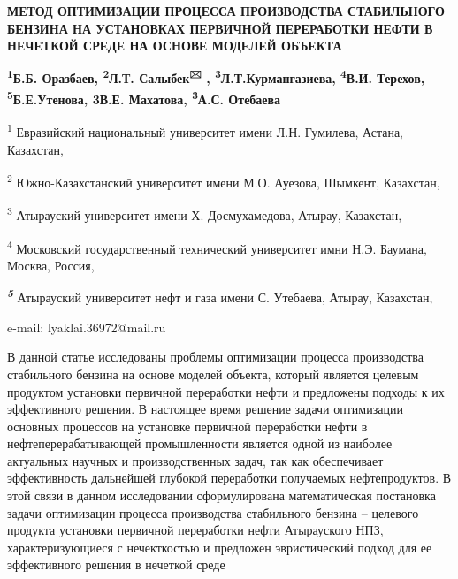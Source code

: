 \begin{center}

{\bfseries МЕТОД ОПТИМИЗАЦИИ ПРОЦЕССА ПРОИЗВОДСТВА СТАБИЛЬНОГО БЕНЗИНА НА УСТАНОВКАХ ПЕРВИЧНОЙ ПЕРЕРАБОТКИ НЕФТИ В НЕЧЕТКОЙ СРЕДЕ НА ОСНОВЕ МОДЕЛЕЙ ОБЪЕКТА}

{\bfseries \textsuperscript{1}Б.Б. Оразбаев, \textsuperscript{2}Л.Т.
Салыбек\textsuperscript{🖂} , \textsuperscript{3}Л.Т.Курмангазиева,
\textsuperscript{4}В.И. Терехов, \textsuperscript{5}Б.Е.Утенова, {3}В.Е. Махатова, \textsuperscript{3}А.С.
Отебаева}

\textsuperscript{1} Евразийский национальный университет имени Л.Н.
Гумилева, Астана, Казахстан,

\textsuperscript{2} Южно-Казахстанский университет имени М.О. Ауезова,
Шымкент, Казахстан,

\textsuperscript{3} Атырауский университет имени Х. Досмухамедова,
Атырау, Казахстан,

\textsuperscript{4} Московский государственный технический университет
имни Н.Э. Баумана, Москва, Россия,

\emph{{\bfseries \textsuperscript{5}}} Атырауский университет нефт и газа
имени С. Утебаева, Атырау, Казахстан,

e-mail: lyaklai.36972@mail.ru
\end{center}

В данной статье исследованы проблемы оптимизации процесса производства
стабильного бензина на основе моделей объекта, который является целевым
продуктом установки первичной переработки нефти и предложены подходы к
их эффективного решения. В настоящее время решение задачи оптимизации
основных процессов на установке первичной переработки нефти в
нефтеперерабатывающей промышленности является одной из наиболее
актуальных научных и производственных задач, так как обеспечивает
эффективность дальнейшей глубокой переработки получаемых нефтепродуктов.
В этой связи в данном исследовании сформулирована математическая
постановка задачи оптимизации процесса производства стабильного бензина
-- целевого продукта установки первичной переработки нефти Атырауского
НПЗ, характеризующиеся с нечекткостью и предложен эвристический подход
для ее эффективного решения в нечеткой среде

